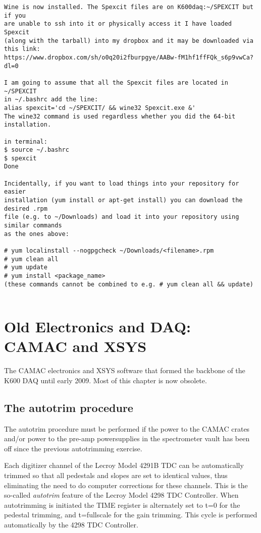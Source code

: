 \documentclass[11pt]{report}
\begin{document}
\begin{verbatim}
Wine is now installed. The Spexcit files are on K600daq:~/SPEXCIT but if you 
are unable to ssh into it or physically access it I have loaded Spexcit 
(along with the tarball) into my dropbox and it may be downloaded via this link:
https://www.dropbox.com/sh/o0q20i2fburpgye/AABw-fM1hf1ffFQk_s6p9vwCa?dl=0

I am going to assume that all the Spexcit files are located in ~/SPEXCIT
in ~/.bashrc add the line:
alias spexcit='cd ~/SPEXCIT/ && wine32 Spexcit.exe &'             
The wine32 command is used regardless whether you did the 64-bit installation.

in terminal:
$ source ~/.bashrc
$ spexcit
Done

Incidentally, if you want to load things into your repository for easier 
installation (yum install or apt-get install) you can download the desired .rpm 
file (e.g. to ~/Downloads) and load it into your repository using similar commands 
as the ones above:

# yum localinstall --nogpgcheck ~/Downloads/<filename>.rpm
# yum clean all
# yum update 
# yum install <package_name>
(these commands cannot be combined to e.g. # yum clean all && update)


\end{verbatim} 

\chapter{Old Electronics and DAQ: CAMAC and XSYS}\label{chap:daq-and-electronics-old}
    

The CAMAC electronics and XSYS software 
that formed the backbone of the K600 DAQ until early 2009.
Most of this chapter is now obsolete.


\section{The autotrim procedure}

The autotrim procedure must be performed if the power to the CAMAC
crates and/or power to the pre-amp powersupplies in the spectrometer 
vault has been off since the previous autotrimming exercise.

Each digitizer channel of the Lecroy Model 4291B TDC can be 
automatically trimmed so that all pedestals and slopes are set to identical
values, thus eliminating the need to do computer corrections for these 
channels.  This is the so-called {\it autotrim} feature of the 
Lecroy Model 4298 TDC Controller.
When autotrimming is initiated the TIME register is alternately set to t=0 
for the pedestal trimming, and t=fullscale for the gain trimming. This
cycle is performed automatically by the 4298 TDC Controller.
\end{document}
